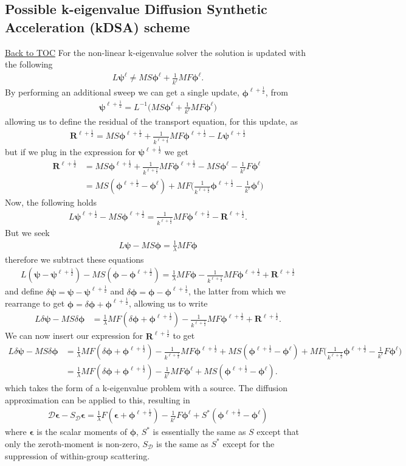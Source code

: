 \documentclass[11pt,letterpaper,notitlepage]{article}
\newcommand{\beqn}{\begin{equation}
		\begin{aligned}}
\newcommand{\eeqn}{\end{aligned}
\end{equation}}
\numberwithin{equation}{section}
\newcommand{\Linv}{L^{-1}}
\newcommand{\bphi}{\boldsymbol{\phi}}
\newcommand{\bpsi}{\boldsymbol{\psi}}
\newcommand{\half}{\frac{1}{2}}
\newcommand{\bepsilon}{\boldsymbol{\epsilon}}
\newcommand{\BackToTOC}{\hyperlink{toc}{\scriptsize{\color{blue}Back to TOC}}\newline}
\begin{document}
\subsection{Possible k-eigenvalue Diffusion Synthetic
	Acceleration (kDSA) scheme} \BackToTOC
For the non-linear k-eigenvalue solver the solution is updated with the following
\beqn 
L\bpsi^{\ell} \ne
MS\bphi^{\ell} + \frac{1}{k^\ell}MF\bphi^\ell.
\eeqn 
By performing an additional sweep we can get a single update, $\bphi^{\ell+\half}$, from
\beqn 
\bpsi^{\ell+\half} = \Linv \biggr(
MS\bphi^{\ell} + \frac{1}{k^\ell}MF\bphi^\ell
\biggr)
\eeqn 
allowing us to define the residual of the transport equation, for this update, as 
\beqn
\mathbf{R}^{\ell+\half} = MS\bphi^{\ell+\half} + \frac{1}{k^{\ell+\half}}MF\bphi^{\ell+\half} - L \bpsi^{\ell+\half}
\eeqn 
but if we plug in the expression for $\bpsi^{\ell+\half}$ we get
\beqn 
\mathbf{R}^{\ell+\half} &= MS\bphi^{\ell+\half} + \frac{1}{k^{\ell+\half}}MF\bphi^{\ell+\half} - MS\bphi^{\ell} - \frac{1}{k^\ell}F\bphi^\ell \\
&= MS(\bphi^{\ell+\half} - \bphi^{\ell}) 
+ MF\biggr(\frac{1}{k^{\ell+\half}}\bphi^{\ell+\half} - \frac{1}{k^{\ell}}\bphi^{\ell}\biggr)
\eeqn 
\newline
Now, the following holds
\beqn 
L \bpsi^{\ell+\half} - MS\bphi^{\ell+\half} = \frac{1}{k^{\ell+\half}} MF\bphi^{\ell+\half} - \mathbf{R}^{\ell+\half}.
\eeqn 
But we seek
\beqn 
L \bpsi - MS\bphi = \frac{1}{\lambda} MF\bphi
\eeqn 
therefore we subtract these equations
\beqn 
L(\bpsi-\bpsi^{\ell+\half}) -MS(\bphi - \bphi^{\ell+\half})= \frac{1}{\lambda} MF\bphi - \frac{1}{k^{\ell+\half}} MF\bphi^{\ell+\half} + \mathbf{R}^{\ell + \half}
\eeqn
and define $\delta \bpsi = \bpsi - \bpsi^{\ell+\half}$ and $\delta \bphi = \bphi - \bphi^{\ell+\half}$, the latter from which we rearrange to get $\bphi = \delta \bphi + \bphi^{\ell+\half}$, allowing us to write 
\beqn 
L\delta \bpsi - MS\delta \bphi &= \frac{1}{\lambda}MF(\delta \bphi + \bphi^{\ell+\half})  - \frac{1}{k^{\ell+\half}} MF\bphi^{\ell+\half} + \mathbf{R}^{\ell + \half}.
\eeqn 
We can now insert our expression for $\mathbf{R}^{\ell + \half}$ to get
\beqn 
L\delta \bpsi - MS\delta \bphi &= \frac{1}{\lambda}MF(\delta \bphi + \bphi^{\ell+\half})  - \frac{1}{k^{\ell+\half}} MF\bphi^{\ell+\half} + MS(\bphi^{\ell+\half} - \bphi^{\ell}) 
+ MF\biggr(\frac{1}{k^{\ell+\half}}\bphi^{\ell+\half} - \frac{1}{k^{\ell}}F\bphi^{\ell}\biggr) \\
&= \frac{1}{\lambda}MF(\delta \bphi + \bphi^{\ell+\half})  - \frac{1}{k^{\ell}} MF\bphi^{\ell} + MS(\bphi^{\ell+\half} - \bphi^{\ell}).
\eeqn 
which takes the form of a k-eigenvalue problem with a source. The diffusion approximation can be applied to this, resulting in
\beqn 
\mathcal{D} \bepsilon - S_{\mathcal{D}} \bepsilon = \frac{1}{\lambda}F(\bepsilon + \bphi^{\ell+\half}) - \frac{1}{k^{\ell}} F\bphi^{\ell} + S^*(\bphi^{\ell+\half} - \bphi^{\ell}) 
\eeqn 
where $\bepsilon$ is the scalar moments of $\bphi$, $S^*$ is essentially the same as $S$ except that only the zeroth-moment is non-zero, $S_{\mathcal{D}}$ is the same as $S^*$ except for the suppression of within-group scattering.
\end{document}
